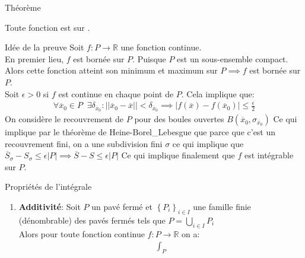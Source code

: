 \begin{parag}{Théorème}
    \begin{theoreme}
        Toute fonction  est  sur .
    \end{theoreme}
    \begin{subparag}{Idée de la preuve}
        Soit $f : P \to \mathbb{R}$ une fonction continue.\\
        En premier lieu, $f$ est bornée sur $P$. Puisque $P$ est un sous-ensemble compact. Alors cette fonction atteint son minimum et maximum sur $P \implies f$ est bornée sur $P$.\\
        Soit $\epsilon > 0$ si $f$ est continue en chaque point de $P$. Cela implique que:
        \begin{align*} \forall \overline{x}_0 \in P\;\; \exists \delta_{\overline{x}_0}  : \left|\left|\overline{x}_0 - \overline{x}\right|\right|< \delta_{\overline{x}_0} \implies \left|f\left(\overline{x}\right) - f\left(\overline{x}_0\right)\right| \leq \frac{\epsilon}{2}
        \end{align*}
        On considère le recouvrement de $P$ pour des boules ouvertes $B\left(\overline{x}_0, \sigma_{\overline{x}_0}\right)$ Ce qui implique par le théorème de Heine-Borel_Lebesgue que parce que c'est un recouvrement fini, on a une subdivision fini $\sigma$ ce qui implique que $\overline{S}_{\sigma} - S_{\sigma} \leq \epsilon\left|P\right| \implies \overline{S} - S \leq \epsilon \left| P\right|$ Ce qui implique finalement que $f$ est intégrable sur $P$.
    \end{subparag}
\end{parag}
\begin{parag}{Propriétés de l'intégrale}
    \begin{enumerate}
        \item \textbf{Additivité}: Soit $P$ un pavé fermé et $\left\{P_i\right\}_{i \in I}$ une famille finie (dénombrable) des pavés fermés tels que $P =  \bigcup_{i \in I}P_i$ \\
            Alors pour toute fonction continue $f: P \to \mathbb{R}$ on a:
            \begin{align*} \int_P \end{align*}

    \end{enumerate}
    
\end{parag}

